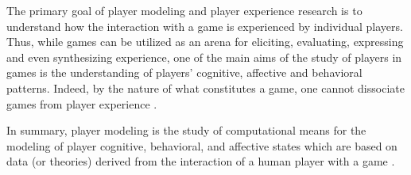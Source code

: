 The primary goal of player modeling and player experience research is to understand how the interaction with a game is experienced by individual players. Thus, while games can be utilized as an arena for eliciting, evaluating, expressing and even synthesizing experience, one of the main aims of the study of players in games is the understanding of players’ cognitive, affective and behavioral patterns. Indeed, by the nature of what constitutes a game, one cannot dissociate games from player experience \citep{YannakakisPlayerModeling2013}. \cite{MunozPlayPhysicsEmotionalGames2010}

In summary, player modeling is the study of computational means for the modeling of player cognitive, behavioral, and affective states which are based on data (or theories) derived from the interaction of a human player with a game \citep{YannakakisGameAIRevisited2012}.